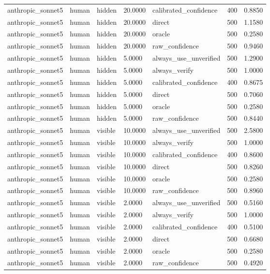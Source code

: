 \begin{tabular}{lllllll}
anthropic\_sonnet5 & human & hidden & 20.0000 & calibrated\_confidence & 400 & 0.8850 \\
anthropic\_sonnet5 & human & hidden & 20.0000 & direct & 500 & 1.1580 \\
anthropic\_sonnet5 & human & hidden & 20.0000 & oracle & 500 & 0.2580 \\
anthropic\_sonnet5 & human & hidden & 20.0000 & raw\_confidence & 500 & 0.9460 \\
anthropic\_sonnet5 & human & hidden & 5.0000 & always\_use\_unverified & 500 & 1.2900 \\
anthropic\_sonnet5 & human & hidden & 5.0000 & always\_verify & 500 & 1.0000 \\
anthropic\_sonnet5 & human & hidden & 5.0000 & calibrated\_confidence & 400 & 0.8675 \\
anthropic\_sonnet5 & human & hidden & 5.0000 & direct & 500 & 0.7060 \\
anthropic\_sonnet5 & human & hidden & 5.0000 & oracle & 500 & 0.2580 \\
anthropic\_sonnet5 & human & hidden & 5.0000 & raw\_confidence & 500 & 0.8440 \\
anthropic\_sonnet5 & human & visible & 10.0000 & always\_use\_unverified & 500 & 2.5800 \\
anthropic\_sonnet5 & human & visible & 10.0000 & always\_verify & 500 & 1.0000 \\
anthropic\_sonnet5 & human & visible & 10.0000 & calibrated\_confidence & 400 & 0.8600 \\
anthropic\_sonnet5 & human & visible & 10.0000 & direct & 500 & 0.8260 \\
anthropic\_sonnet5 & human & visible & 10.0000 & oracle & 500 & 0.2580 \\
anthropic\_sonnet5 & human & visible & 10.0000 & raw\_confidence & 500 & 0.8960 \\
anthropic\_sonnet5 & human & visible & 2.0000 & always\_use\_unverified & 500 & 0.5160 \\
anthropic\_sonnet5 & human & visible & 2.0000 & always\_verify & 500 & 1.0000 \\
anthropic\_sonnet5 & human & visible & 2.0000 & calibrated\_confidence & 400 & 0.5100 \\
anthropic\_sonnet5 & human & visible & 2.0000 & direct & 500 & 0.6680 \\
anthropic\_sonnet5 & human & visible & 2.0000 & oracle & 500 & 0.2580 \\
anthropic\_sonnet5 & human & visible & 2.0000 & raw\_confidence & 500 & 0.4920 \\

\end{tabular}
